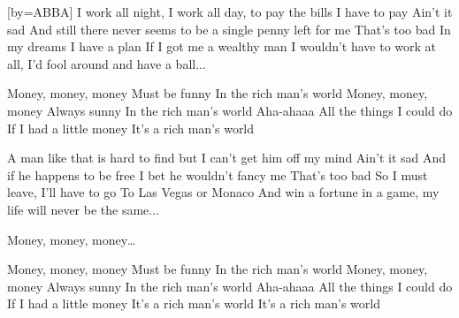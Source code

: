 [by={ABBA}]
\beginverse
I work all night, I work all day, to pay the bills I have to pay
Ain't it sad
And still there never seems to be a single penny left for me
That's too bad
In my dreams I have a plan
If I got me a wealthy man
I wouldn't have to work at all, I'd fool around and have a ball...
\endverse

\beginchorus 
Money, money, money
Must be funny
In the rich man's world
Money, money, money
Always sunny
In the rich man's world
Aha-ahaaa
All the things I could do
If I had a little money
It's a rich man's world
\endchorus 

\beginverse
A man like that is hard to find but I can't get him off my mind
Ain't it sad
And if he happens to be free I bet he wouldn't fancy me
That's too bad
So I must leave, I'll have to go
To Las Vegas or Monaco
And win a fortune in a game, my life will never be the same...
\endverse

\beginchorus 
Money, money, money\dots
\endchorus 

\beginchorus 
Money, money, money
Must be funny
In the rich man's world
Money, money, money
Always sunny
In the rich man's world
Aha-ahaaa
All the things I could do
If I had a little money
It's a rich man's world
It's a rich man's world
\endchorus 
\endsong

